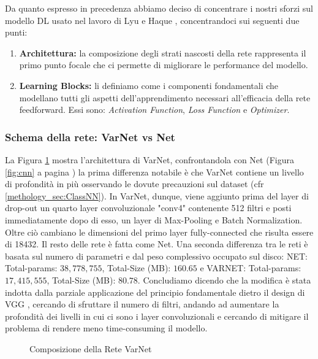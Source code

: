 Da quanto espresso in precedenza abbiamo deciso di concentrare i nostri sforzi sul modello DL usato nel lavoro di Lyu e
Haque \cite{lyu2018deep}, concentrandoci sui seguenti due punti:
\begin{enumerate}
    \item \textbf{Architettura:} la composizione degli strati nascosti della rete rappresenta il primo punto focale 
    che ci permette di migliorare le performance del modello.
    \item \textbf{Learning Blocks:} li definiamo come i componenti fondamentali che modellano tutti gli aspetti 
    dell'apprendimento necessari all'efficacia della rete feedforward. Essi sono: \textit{Activation Function},
    \textit{Loss Function} e \textit{Optimizer}. 
\end{enumerate}
\subsubsection{Schema della rete: VarNet vs Net}
La Figura \ref{fig:varnet-structure} mostra l'architettura di VarNet, confrontandola con Net (Figura \ref{fig:cnn} a
pagina \pageref{fig:cnn}) la prima differenza notabile è che VarNet contiene un livello di profondità in più 
osservando le dovute precauzioni sul dataset (cfr \ref{methology_sec:ClassNN}). 
In VarNet, dunque, viene aggiunto prima del layer di drop-out un quarto layer
convoluzionale "conv4" contenente 512 filtri e posti immediatamente dopo di esso, un layer di Max-Pooling e Batch
Normalization. Oltre ciò cambiano le dimensioni del primo layer fully-connected che risulta essere di 18432. Il resto
delle rete è fatta come Net. Una seconda differenza tra le reti è basata sul numero di parametri e dal peso complessivo
occupato sul disco: NET: Total-params: $38,778,755$, Total-Size (MB): $160.65$ e VARNET: Total-params: $17,415,555$,
Total-Size (MB): $80.78$. 
Concludiamo dicendo che la modifica è stata indotta dalla parziale applicazione del principio fondamentale dietro il
design di VGG \cite{simonyan2014very}, cercando di sfruttare il numero di filtri, andando ad aumentare la profondità dei
livelli in cui ci sono i layer convoluzionali e cercando di mitigare il problema di rendere meno time-consuming il
modello.
\begin{figure}[h!]
		\centering
		
  		\caption{Composizione della Rete VarNet}
        \label{fig:varnet-structure}
\end{figure}
